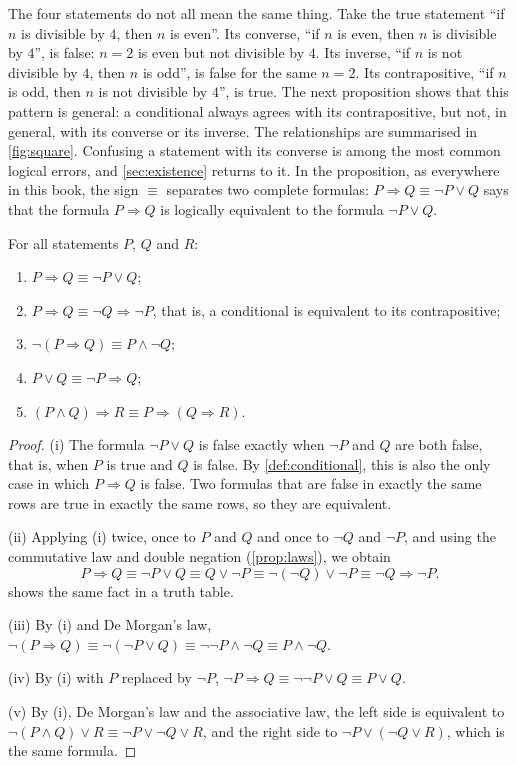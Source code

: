 The four statements do not all mean the same thing. Take the true statement ``if $n$ is divisible by $4$, then $n$ is even''. Its converse, ``if $n$ is even, then $n$ is divisible by $4$'', is false: $n=2$ is even but not divisible by $4$. Its inverse, ``if $n$ is not divisible by $4$, then $n$ is odd'', is false for the same $n=2$. Its contrapositive, ``if $n$ is odd, then $n$ is not divisible by $4$'', is true. The next proposition shows that this pattern is general: a conditional always agrees with its contrapositive, but not, in general, with its converse or its inverse. The relationships are summarised in \cref{fig:square}. Confusing a statement with its converse is among the most common logical errors, and \cref{sec:existence} returns to it. In the proposition, as everywhere in this book, the sign $\equiv$ separates two complete formulas: $P\Rightarrow Q\equiv\neg P\vee Q$ says that the formula $P\Rightarrow Q$ is logically equivalent to the formula $\neg P\vee Q$.

\begin{proposition}
\label{prop:implication-laws}
For all statements $P$, $Q$ and $R$:
\begin{enumerate}
\item $P\Rightarrow Q\equiv\neg P\vee Q$;
\item $P\Rightarrow Q\equiv\neg Q\Rightarrow\neg P$, that is, a conditional is equivalent to its contrapositive;
\item $\neg(P\Rightarrow Q)\equiv P\wedge\neg Q$;
\item $P\vee Q\equiv\neg P\Rightarrow Q$;
\item $(P\wedge Q)\Rightarrow R\equiv P\Rightarrow(Q\Rightarrow R)$.
\end{enumerate}
\end{proposition}

\begin{proof}
(i) The formula $\neg P\vee Q$ is false exactly when $\neg P$ and $Q$ are both false, that is, when $P$ is true and $Q$ is false. By \cref{def:conditional}, this is also the only case in which $P\Rightarrow Q$ is false. Two formulas that are false in exactly the same rows are true in exactly the same rows, so they are equivalent.

(ii) Applying (i) twice, once to $P$ and $Q$ and once to $\neg Q$ and $\neg P$, and using the commutative law and double negation (\cref{prop:laws}), we obtain
\[
P\Rightarrow Q\equiv\neg P\vee Q\equiv Q\vee\neg P\equiv\neg(\neg Q)\vee\neg P\equiv\neg Q\Rightarrow\neg P .
\]
 shows the same fact in a truth table.

(iii) By (i) and De Morgan's law, $\neg(P\Rightarrow Q)\equiv\neg(\neg P\vee Q)\equiv\neg\neg P\wedge\neg Q\equiv P\wedge\neg Q$.

(iv) By (i) with $P$ replaced by $\neg P$, $\neg P\Rightarrow Q\equiv\neg\neg P\vee Q\equiv P\vee Q$.

(v) By (i), De Morgan's law and the associative law, the left side is equivalent to $\neg(P\wedge Q)\vee R\equiv\neg P\vee\neg Q\vee R$, and the right side to $\neg P\vee(\neg Q\vee R)$, which is the same formula.
\end{proof}


